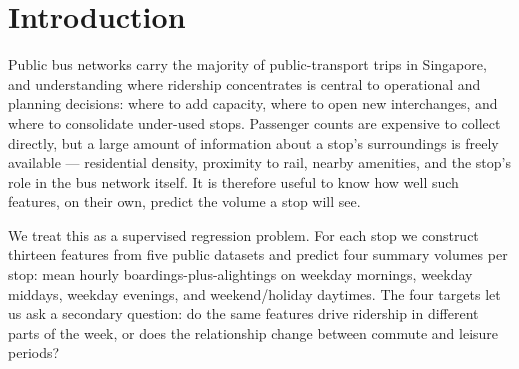\documentclass{article}
\begin{document}


\begin{abstract}
  We predict passenger volume at Singapore bus stops from spatial and network
  features derived from public datasets on residential density, MRT
  connectivity, points of interest, and bus-line structure. Using engineered
  per-stop features, we compare linear and tree-based models
  across four temporal targets (weekday morning, midday, evening, and
  weekend/holiday averages) under repeated train/test splits.
\end{abstract}

\section{Introduction}
\label{sec:intro}

Public bus networks carry the majority of public-transport trips in Singapore,
and understanding where ridership concentrates is central to operational and
planning decisions: where to add capacity, where to open new interchanges,
and where to consolidate under-used stops. Passenger counts are expensive to
collect directly, but a large amount of information about a stop's
surroundings is freely available --- residential density, proximity to rail,
nearby amenities, and the stop's role in the bus network itself. It is
therefore useful to know how well such features, on their own, predict the
volume a stop will see.

We treat this as a supervised regression problem. For each stop we construct
thirteen features from five public datasets and predict four summary volumes
per stop: mean hourly boardings-plus-alightings on weekday mornings,
weekday middays, weekday evenings, and weekend/holiday daytimes. The four
targets let us ask a secondary question: do the same features drive
ridership in different parts of the week, or does the relationship change
between commute and leisure periods?
\end{document}
